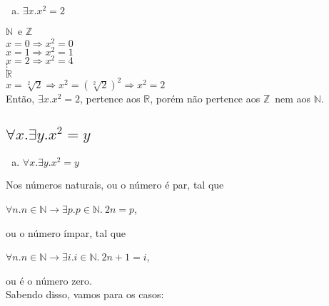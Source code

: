 \documentclass[aspectratio=43]{beamer}
\newcommand{\nat}{$\mathbb{N}$}
\newcommand{\Nat}{\mathbb{N}}
\newcommand{\inteiro}{$\mathbb{Z}$}
\newcommand{\real}{$\mathbb{R}$}
\begin{document}
    \begin{frame}[fragile]
    
    \begin{enumerate}[a)]
		\item $\exists x.x^{2} = 2$
	\end{enumerate}
    \pause
    \nat \ e \inteiro \\
    ${x = 0 \Rightarrow x^2 = 0}$ \\
    \pause
    ${x = 1 \Rightarrow x^2 = 1}$ \\
    \pause
    ${x = 2 \Rightarrow x^2 = 4}$ \\
    $\vdots$ \\
	\pause
    \vspace{5pt}
    \real \\
    ${x=\sqrt[2]{2} \Rightarrow x^2 = (\sqrt[2]{2})^2 \Rightarrow x^2 = 2}$ \\
    \pause
    Ent\~ao, $\exists x.x^{2} = 2$, pertence aos \real, por\'em n\~ao pertence aos \inteiro\ nem aos \nat .\\
    
	\end{frame}
    
    \subsection{$\forall x.\exists y. x^{2} = y$}
    
    \begin{frame}[fragile]
    
    \begin{enumerate}[b)]
		\item $\forall x.\exists y. x^{2} = y$
	\end{enumerate}
    \pause
    Nos n\'umeros naturais, ou o n\'umero \'e par, tal que 
    \begin{center}
    $\forall n. n \in \Nat \to \exists p.p \in \Nat .\ 2n = p$,
	\end{center}
    ou o n\'umero \' impar, tal que 
    \begin{center}    
    $\forall n. n \in \Nat \to \exists i.i \in \Nat .\ 2n +1 = i$,
    \end{center}
    ou \'e o n\'umero zero.\\
    Sabendo disso, vamos para os casos:\\
	
	\end{frame}
    
\end{document}
